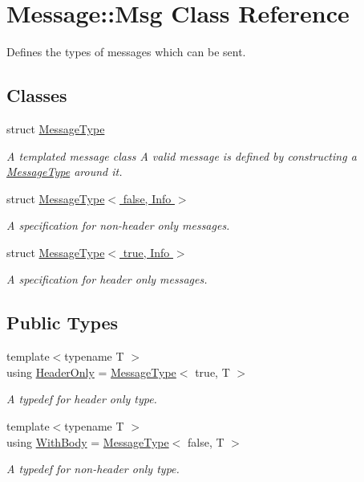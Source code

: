 \hypertarget{class_message_1_1_msg}{\section{Message\-:\-:Msg Class Reference}
\label{class_message_1_1_msg}
}


Defines the types of messages which can be sent.  


\subsection*{Classes}
\begin{DoxyCompactItemize}
\item 
struct \hyperlink{struct_message_1_1_msg_1_1_message_type}{Message\-Type}
\begin{DoxyCompactList}\small\item\em A templated message class A valid message is defined by constructing a \hyperlink{struct_message_1_1_msg_1_1_message_type}{Message\-Type} around it. \end{DoxyCompactList}\item 
struct \hyperlink{struct_message_1_1_msg_1_1_message_type_3_01false_00_01_info_01_4}{Message\-Type$<$ false, Info $>$}
\begin{DoxyCompactList}\small\item\em A specification for non-\/header only messages. \end{DoxyCompactList}\item 
struct \hyperlink{struct_message_1_1_msg_1_1_message_type_3_01true_00_01_info_01_4}{Message\-Type$<$ true, Info $>$}
\begin{DoxyCompactList}\small\item\em A specification for header only messages. \end{DoxyCompactList}\end{DoxyCompactItemize}
\subsection*{Public Types}
\begin{DoxyCompactItemize}
\item 
{\footnotesize template$<$typename T $>$ }\\using \hyperlink{class_message_1_1_msg_a56cc5b2c5d898b85e97b1f3a46ab3999}{Header\-Only} = \hyperlink{struct_message_1_1_msg_1_1_message_type}{Message\-Type}$<$ true, T $>$
\begin{DoxyCompactList}\small\item\em A typedef for header only type. \end{DoxyCompactList}\item 
{\footnotesize template$<$typename T $>$ }\\using \hyperlink{class_message_1_1_msg_a385691f2f7fc10f0b4c1544b8892a6c9}{With\-Body} = \hyperlink{struct_message_1_1_msg_1_1_message_type}{Message\-Type}$<$ false, T $>$
\begin{DoxyCompactList}\small\item\em A typedef for non-\/header only type. \end{DoxyCompactList}\end{DoxyCompactItemize}
